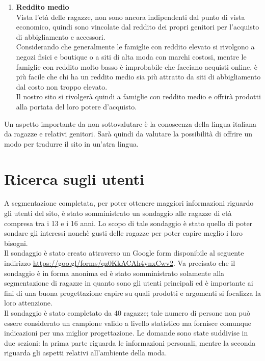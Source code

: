 \documentclass[12pt,a4paper]{report}
\begin{document}
\begin{enumerate}
\begin{enumerate}[label=\alph*.]
   \item \textbf{Reddito medio}\\
   Vista l'età delle ragazze, non sono ancora indipendenti dal punto di vista economico, quindi sono vincolate dal reddito dei propri genitori per l'acquisto di abbigliamento e accessori.\\
   Considerando che generalmente le famiglie con reddito elevato si rivolgono a negozi fisici e boutique o a siti di alta moda con marchi costosi, mentre le famiglie con reddito molto basso è improbabile che facciano acquisti online, è più facile che chi ha un reddito medio sia più attratto da siti di abbigliamento dal costo non troppo elevato.\\
   Il nostro sito si rivolgerà quindi a famiglie con reddito medio e offrirà prodotti alla portata del loro potere d'acquisto.
   \end{enumerate}
 \end{enumerate}
 Un aspetto importante da non sottovalutare è la conoscenza della lingua italiana da ragazze e relativi genitori. Sarà quindi da valutare la possibilità di offrire un modo per tradurre il sito in un'atra lingua.
\section{Ricerca sugli utenti}
A segmentazione completata, per poter ottenere maggiori informazioni riguardo gli utenti del sito, è stato somministrato un sondaggio alle ragazze di età compresa tra i 13 e i 16 anni. Lo scopo di tale sondaggio è stato quello di poter sondare gli interessi nonchè gusti delle ragazze per poter capire meglio i loro bisogni.\\ Il sondaggio è stato creato attraverso un Google form disponibile al seguente indirizzo \href{run:https://goo.gl/forms/qz0KkACAh4ynxCwv2}{https://goo.gl/forms/qz0KkACAh4ynxCwv2}.
Va precisato che il sondaggio è in forma anonima ed è stato somministrato solamente alla segmentazione di ragazze in quanto sono gli utenti principali ed è importante ai fini di una buona progettazione capire su quali prodotti e argomenti si focalizza la loro attenzione.\\
Il sondaggio è stato completato da 40 ragazze; tale numero di persone non può essere considerato un campione valido a livello statistico ma fornisce comunque indicazioni per una miglior progettazione. Le domande sono state suddivise in due sezioni: la prima parte riguarda le informazioni personali, mentre la seconda riguarda gli aspetti relativi all'ambiente della moda.
\end{document}
